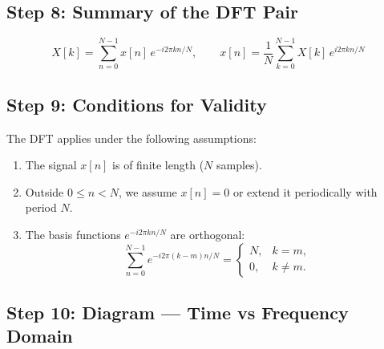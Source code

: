 \documentclass[a4paper,12pt]{article}
\begin{document}
\subsection{Step 8: Summary of the DFT Pair}

\[
\boxed{
X[k] = \sum_{n=0}^{N-1} x[n]\, e^{-i 2\pi kn / N}, 
\qquad
x[n] = \frac{1}{N} \sum_{k=0}^{N-1} X[k]\, e^{i 2\pi kn / N}
}
\]

\subsection{Step 9: Conditions for Validity}

The DFT applies under the following assumptions:
\begin{enumerate}
    \item The signal $x[n]$ is of finite length ($N$ samples).
    \item Outside $0 \leq n < N$, we assume $x[n]=0$ or extend it periodically with period $N$.
    \item The basis functions $e^{-i2\pi kn/N}$ are orthogonal:
    \[
    \sum_{n=0}^{N-1} e^{-i2\pi (k-m)n/N} = 
    \begin{cases}
    N, & k=m, \\
    0, & k \neq m.
    \end{cases}
    \]
\end{enumerate}

\subsection{Step 10: Diagram — Time vs Frequency Domain}

\begin{center}
\end{center}
\end{document}
